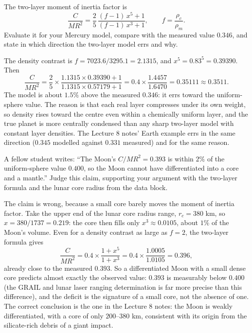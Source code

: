 \parti The two-layer moment of inertia factor is
\[
\frac{C}{MR^2} = \frac{2}{5}\,\frac{(f-1)\,x^5 + 1}{(f-1)\,x^3 + 1},
\qquad f = \frac{\rho_c}{\rho_m}.
\]
Evaluate it for your Mercury model,
compare with the measured value $0.346$,
and state in which direction the two-layer model errs and why.

\begin{solution}
The density contrast is $f = 7023.6/3295.1 = 2.1315$, and $x^5 = 0.83^5 = 0.39390$. Then
\[
\frac{C}{MR^2} = \frac{2}{5} \times \frac{1.1315 \times 0.39390 + 1}{1.1315 \times 0.57179 + 1}
= 0.4 \times \frac{1.4457}{1.6470} = 0.35111 \approx 0.3511.
\]
The model is about $1.5\%$ above the measured $0.346$: it errs toward the uniform-sphere value.
The reason is that each real layer compresses under its own weight,
so density rises toward the centre even within a chemically uniform layer,
and the true planet is more centrally condensed than any sharp two-layer model with constant layer densities.
The Lecture 8 notes' Earth example errs in the same direction ($0.345$ modelled against $0.331$ measured) and for the same reason.
\end{solution}

\parti A fellow student writes: ``The Moon's $C/MR^2 = 0.393$ is within $2\%$ of the uniform-sphere value $0.400$,
so the Moon cannot have differentiated into a core and a mantle.''
Judge this claim, supporting your argument with the two-layer formula and the lunar core radius from the data block.

\begin{solution}
The claim is wrong, because a small core barely moves the moment of inertia factor.
Take the upper end of the lunar core radius range, $r_c = 380$ km, so $x = 380/1737 = 0.219$:
the core then fills only $x^3 \approx 0.0105$, about $1\%$ of the Moon's volume.
Even for a density contrast as large as $f = 2$, the two-layer formula gives
\[
\frac{C}{MR^2} = 0.4 \times \frac{1 + x^5}{1 + x^3} = 0.4 \times \frac{1.0005}{1.0105} = 0.396,
\]
already close to the measured $0.393$.
So a differentiated Moon with a small dense core predicts almost exactly the observed value:
$0.393$ is measurably below $0.400$ (the GRAIL and lunar laser ranging determination is far more precise than this difference),
and the deficit is the signature of a small core, not the absence of one.
The correct conclusion is the one in the Lecture 8 notes: the Moon is weakly differentiated,
with a core of only $200$--$380$ km, consistent with its origin from the silicate-rich debris of a giant impact.
\end{solution}


